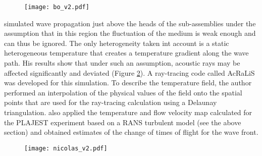     \begin{figure}[htbp]
        \centerline{\texttt{[image: bo\_v2.pdf]}}
        \label{fig:bo}
    \end{figure}
%
    \textcite{Massacret2014Etudedunemethode} simulated wave propagation just above the heads of the sub-assemblies under the assumption that in this region the
fluctuation of the medium is weak enough and can thus be ignored.
    The only heterogeneity taken int account is a static heterogeneous temperature that creates a temperature gradient along the wave path.
    His results show that under such an assumption, acoustic rays may be affected significantly and deviated (Figure \ref{fig:nicolas}). A ray-tracing code
called AcRaLiS was developed for this simulation. To describe the temperature field, the author performed an interpolation of the physical values of the field
onto the spatial points that are used for the ray-tracing calculation using a Delaunay triangulation.
    \textcite{Massacret2014Etudedunemethode} also applied the temperature and flow velocity map calculated for the PLAJEST experiment based on a RANS turbulent model (see the above section)
and obtained estimates of the change of times of flight for the wave front.
    \begin{figure}[htbp]
        \centerline{\texttt{[image: nicolas\_v2.pdf]}}
        \label{fig:nicolas}
    \end{figure}

